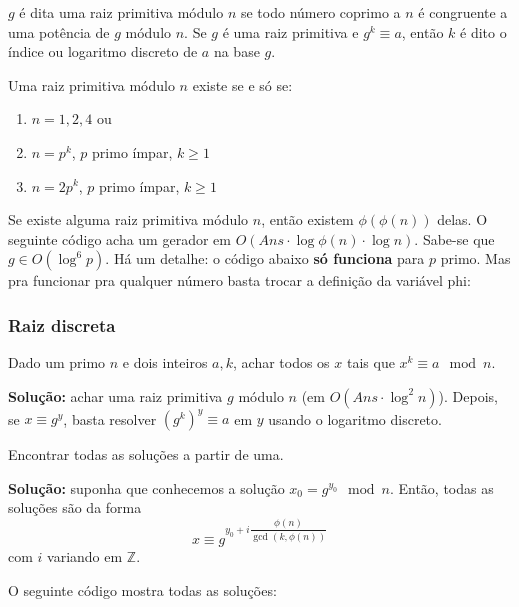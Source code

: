 $g$ é dita uma raiz primitiva módulo $n$ se todo número coprimo a $n$ é congruente a uma potência de $g$ módulo $n$. Se $g$ é uma raiz primitiva e $g^k \equiv a$, então $k$ é dito o índice ou logaritmo discreto de $a$ na base $g$.

Uma raiz primitiva módulo $n$ existe se e só se:

\begin{enumerate}
    \item $n=1,2,4$ ou
    \item $n = p^k$, $p$ primo ímpar, $k \geq 1$
    \item $n = 2p^k$, $p$ primo ímpar, $k \geq 1$
\end{enumerate}

Se existe alguma raiz primitiva módulo $n$, então existem $\phi(\phi(n))$ delas. O seguinte código acha um gerador em $O(Ans \cdot \log \phi(n) \cdot \log n)$. Sabe-se que $g \in O(\log^6 p)$. Há um detalhe: o código abaixo \textbf{só funciona} para $p$ primo. Mas pra funcionar pra qualquer número basta trocar a definição da variável phi:


\subsubsection{Raiz discreta}

Dado um primo $n$ e dois inteiros $a, k$, achar todos os $x$ tais que $x^k \equiv a \mod n$.

\textbf{Solução:} achar uma raiz primitiva $g$ módulo $n$ (em $O(Ans \cdot \log^2 n)$). Depois, se $x \equiv g^y$, basta resolver $(g^k)^y \equiv a$ em $y$ usando o logaritmo discreto.

 Encontrar todas as soluções a partir de uma.

\textbf{Solução:} suponha que conhecemos a solução $x_0 = g^{y_0} \mod n$. Então, todas as soluções são da forma
$$x \equiv g^{y_0 + i \dfrac{\phi(n)}{\gcd(k, \phi(n))}}$$
com $i$ variando em $\mathbb{Z}$.

O seguinte código mostra todas as soluções:

